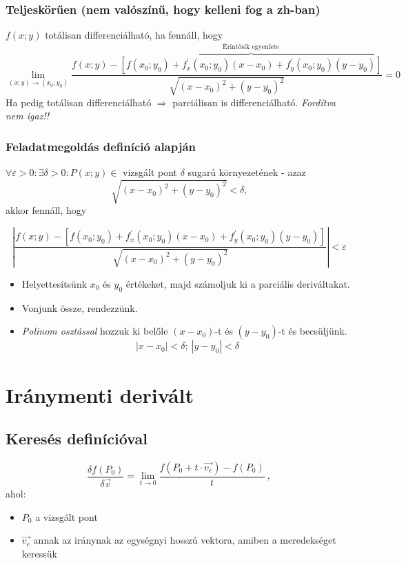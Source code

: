 \documentclass[a4paper,12pt]{article}
\begin{document}
\subsubsection{Teljeskörűen (nem valószínű, hogy kelleni fog a zh-ban)}

$f(x;y)$ totálisan differenciálható, ha fennáll, hogy
\begin{equation}
  \lim_{(x;y) \rightarrow (x_0;y_0)} \frac{f(x;y) - \overbrace{\left[ f(x_0;y_0) + f^{'}_x(x_0;y_0)(x-x_0) + f^{'}_y(x_0;y_0)(y-y_0)  \right]}^{\text{Érintősík egyenlete}}}{\sqrt{(x-x_0)^2 + (y-y_0)^2}} = 0
\end{equation}
Ha pedig totálisan differenciálható $\Rightarrow$ parciálisan is differenciálható. \emph{Fordítva nem igaz!!}

\newpage

\subsubsection*{Feladatmegoldás definíció alapján}

$\forall \varepsilon > 0: \exists \delta > 0: P(x;y) \in$ vizsgált pont $\delta$ sugarú környezetének - azaz
\[
  \sqrt{(x-x_0)^2 + (y-y_0)^2} < \delta \text{,}
\]
akkor fennáll, hogy

\begin{equation}
  \left| \frac{f(x;y) - \left[ f(x_0;y_0) + f^{'}_x(x_0;y_0)(x-x_0) + f^{'}_y(x_0;y_0)(y-y_0)  \right]}{\sqrt{(x-x_0)^2 + (y-y_0)^2}} \right| < \varepsilon
\end{equation}
\begin{itemize}
\item Helyettesítsünk $x_0$ és $y_0$ értékeket, majd számoljuk ki a parciális deriváltakat.
\item Vonjunk össze, rendezzünk.
\item \emph{Polinom osztással} hozzuk ki belőle $(x-x_0)$-t és $(y-y_0)$-t és becsüljünk.
  \[
    |x-x_0| < \delta;\ |y-y_0| < \delta
  \]
\end{itemize}

\section{Iránymenti derivált}
\subsection{Keresés definícióval}
\begin{equation}
  \frac{\delta f(P_0)}{\delta \vec{v}} = \lim_{t \rightarrow 0} \frac{f(P_0 + t \cdot \vec{v_e}) - f(P_0)}{t}\ ,
\end{equation}
ahol:
\begin{itemize}
\item $P_0$ a vizsgált pont
\item $\vec{v_e}$ annak az iránynak az egységnyi hosszú vektora, amiben a meredekséget keressük
\end{itemize}
\end{document}
